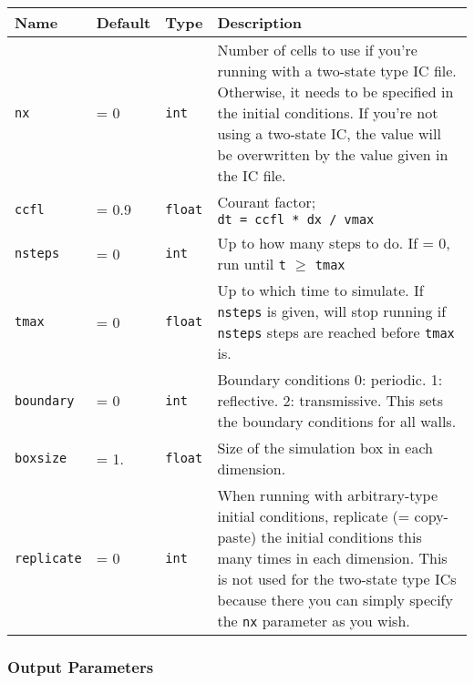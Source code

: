 \begin{tabular}[c]{p{2.5cm} p{1.5cm} p{} p{}}
Name & Default & Type & Description \\
\hline
\hline
\texttt{nx} &
    = 0 &
    \texttt{int} &
    Number of cells to use if you're running with a two-state type IC file.
    Otherwise, it needs to be specified in the initial conditions. If you're not
    using a two-state IC, the value will be overwritten by the value given in
    the IC file.
\\ \hline
\texttt{ccfl} &
    = 0.9 &
    \texttt{float} &
    Courant factor; \texttt{dt\ =\ ccfl\ *\ dx\ /\ vmax}
\\ \hline
\texttt{nsteps} &
    = 0 &
    \texttt{int} &
    Up to how many steps to do. If = 0, run until \texttt{t}
    $\geq$ \texttt{tmax}
\\ \hline
\texttt{tmax} &
    = 0 &
    \texttt{float} &
    Up to which time to simulate. If \texttt{nsteps} is given, will stop running
    if \texttt{nsteps} steps are reached before \texttt{tmax} is.
\\ \hline
\texttt{boundary} &
    = 0 &
    \texttt{int} &
    Boundary conditions 0: periodic. 1: reflective. 2: transmissive. This sets
    the boundary conditions for all walls.
\\ \hline
\texttt{boxsize} &
    = 1. &
    \texttt{float} &
    Size of the simulation box in each dimension.
\\ \hline
\texttt{replicate} &
    = 0 &
    \texttt{int} &
    When running with arbitrary-type initial conditions, replicate (=
    copy-paste) the initial conditions this many times in each dimension. This
    is not used for the two-state type ICs because there you can simply specify
    the \texttt{nx} parameter as you wish.
\\ \hline
\end{tabular}







\subsubsection{Output Parameters}

